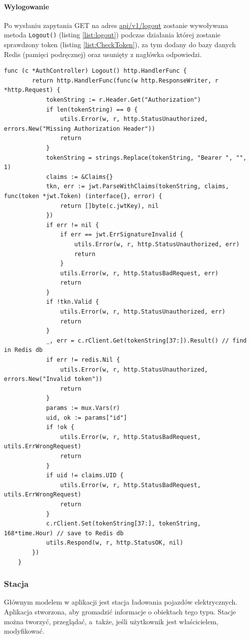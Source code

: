 \paragraph{Wylogowanie\newline}
Po wysłaniu zapytania GET na adres \url{api/v1/logout} zostanie wywoływana metoda \texttt{Logout()} (listing \ref{list:logout}) podczas działania której zostanie sprawdzony token (listing \ref{list:CheckToken}), za tym dodany do bazy danych Redis (pamięci podręcznej) oraz usunięty z nagłówka odpowiedzi.
\begin{lstlisting}[label=list:logout,caption=Wylogowanie.,basicstyle=\tiny\ttfamily]
    func (c *AuthController) Logout() http.HandlerFunc {
        return http.HandlerFunc(func(w http.ResponseWriter, r *http.Request) {
            tokenString := r.Header.Get("Authorization")
            if len(tokenString) == 0 {
                utils.Error(w, r, http.StatusUnauthorized, errors.New("Missing Authorization Header"))
                return
            }
            tokenString = strings.Replace(tokenString, "Bearer ", "", 1)
            claims := &Claims{}
            tkn, err := jwt.ParseWithClaims(tokenString, claims, func(token *jwt.Token) (interface{}, error) {
                return []byte(c.jwtKey), nil
            })
            if err != nil {
                if err == jwt.ErrSignatureInvalid {
                    utils.Error(w, r, http.StatusUnauthorized, err)
                    return
                }
                utils.Error(w, r, http.StatusBadRequest, err)
                return
            }
            if !tkn.Valid {
                utils.Error(w, r, http.StatusUnauthorized, err)
                return
            }
            _, err = c.rClient.Get(tokenString[37:]).Result() // find in Redis db
            if err != redis.Nil {
                utils.Error(w, r, http.StatusUnauthorized, errors.New("Invalid token"))
                return
            }
            params := mux.Vars(r)
            uid, ok := params["id"]
            if !ok {
                utils.Error(w, r, http.StatusBadRequest, utils.ErrWrongRequest)
                return
            }
            if uid != claims.UID {
                utils.Error(w, r, http.StatusBadRequest, utils.ErrWrongRequest)
                return
            }
            c.rClient.Set(tokenString[37:], tokenString, 168*time.Hour) // save to Redis db
            utils.Respond(w, r, http.StatusOK, nil)
        })
    }
\end{lstlisting}

\subsubsection{Stacja}
Głównym modelem w aplikacji jest stacja ładowania pojazdów elektrycznych. Aplikacja stworzona, aby gromadzić informacje o obiektach tego typu. Stacje można tworzyć, przeglądać, a~także, jeśli użytkownik jest właścicielem, modyfikować.

